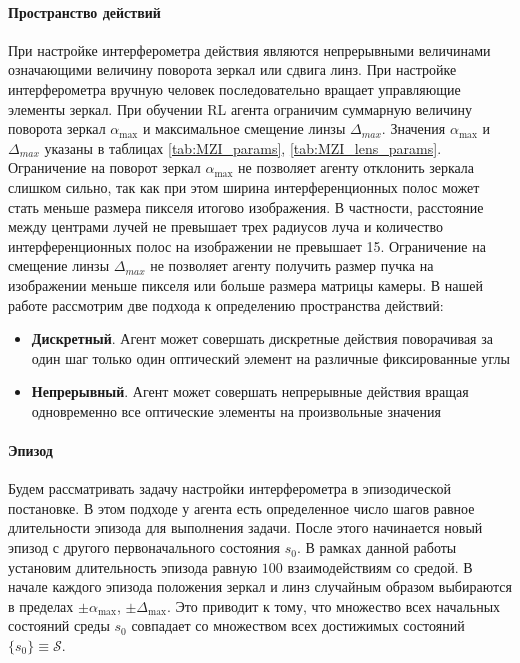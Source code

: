 \paragraph{Пространство действий}
При настройке интерферометра действия являются непрерывными величинами означающими величину поворота зеркал или сдвига линз. При настройке интерферометра вручную человек последовательно вращает управляющие элементы зеркал. При обучении RL агента ограничим суммарную величину поворота зеркал $\alpha_{\max}$ и максимальное смещение линзы $\Delta_{max}$. Значения $\alpha_{\max}$ и $\Delta_{max}$ указаны в таблицах \ref{tab:MZI_params}, \ref{tab:MZI_lens_params}. Ограничение на поворот зеркал $\alpha_{\max}$ не позволяет агенту отклонить зеркала слишком сильно, так как при этом ширина интерференционных полос может стать меньше размера пикселя итогово изображения. В частности, расстояние между центрами лучей не превышает трех радиусов луча и количество интерференционных полос на изображении не превышает 15. Ограничение на смещение линзы $\Delta_{max}$ не позволяет агенту получить размер пучка на изображении меньше пикселя или больше размера матрицы камеры. В нашей работе рассмотрим две подхода к определению пространства действий:

\begin{itemize}
    \item \textbf{Дискретный}. Агент может совершать дискретные действия поворачивая за один шаг только один оптический элемент на различные фиксированные углы
    \item \textbf{Непрерывный}. Агент может совершать непрерывные действия вращая одновременно все оптические элементы на произвольные значения
\end{itemize}

\paragraph{Эпизод}
Будем рассматривать задачу настройки интерферометра в эпизодической постановке. В этом подходе у агента есть определенное число шагов равное длительности эпизода для выполнения задачи. После этого начинается новый эпизод с другого первоначального состояния $s_0$. В рамках данной работы установим длительность эпизода равную $100$ взаимодействиям со средой. В начале каждого эпизода положения зеркал и линз случайным образом выбираются в пределах  $\pm\alpha_{\max}$, $\pm\Delta_{\max}$. Это приводит к тому, что множество всех начальных состояний среды $s_0$ совпадает со множеством всех достижимых состояний $\{s_0\} \equiv \mathcal{S}$. 


